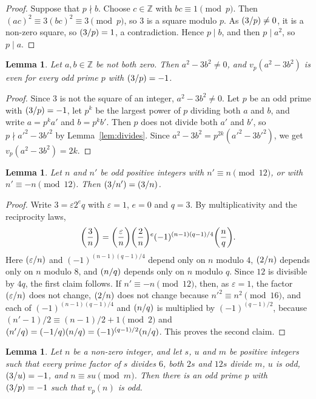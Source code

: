 \documentclass[11pt]{article}
\newtheorem{lemma}[theorem]{Lemma}
\newcommand{\Z}{\mathbb{Z}}
\newcommand{\leg}[2]{\mathchoice{\biggl(\dfrac{#1}{#2}\biggr)}{(#1/#2)}{(#1/#2)}{(#1/#2)}}
\begin{document}
\begin{proof}
Suppose that $p\nmid b$. Choose $c\in\Z$ with $bc\equiv1\pmod p$. Then $(ac)^2\equiv3(bc)^2\equiv3\pmod p$, so $3$ is a square modulo $p$. As $\leg{3}{p}\neq0$, it is a non-zero square, so $\leg{3}{p}=1$, a contradiction. Hence $p\mid b$, and then $p\mid a^2$, so $p\mid a$.
\end{proof}

\begin{lemma}\label{lem:even}
Let $a,b\in\Z$ be not both zero. Then $a^2-3b^2\neq0$, and $v_p(a^2-3b^2)$ is even for every odd prime $p$ with $\leg{3}{p}=-1$.
\end{lemma}

\begin{proof}
Since $3$ is not the square of an integer, $a^2-3b^2\neq0$. Let $p$ be an odd prime with $\leg{3}{p}=-1$, let $p^k$ be the largest power of $p$ dividing both $a$ and $b$, and write $a=p^ka'$ and $b=p^kb'$. Then $p$ does not divide both $a'$ and $b'$, so $p\nmid a'^2-3b'^2$ by Lemma~\ref{lem:divides}. Since $a^2-3b^2=p^{2k}(a'^2-3b'^2)$, we get $v_p(a^2-3b^2)=2k$.
\end{proof}

\begin{lemma}\label{lem:period}
Let $n$ and $n'$ be odd positive integers with $n'\equiv n\pmod{12}$, or with $n'\equiv-n\pmod{12}$. Then $\leg{3}{n'}=\leg{3}{n}$.
\end{lemma}

\begin{proof}
Write $3=\varepsilon2^eq$ with $\varepsilon=1$, $e=0$ and $q=3$. By multiplicativity and the reciprocity laws,
\[
\leg{3}{n}=\leg{\varepsilon}{n}\leg{2}{n}^e(-1)^{(n-1)(q-1)/4}\leg{n}{q}.
\]
Here $\leg{\varepsilon}{n}$ and $(-1)^{(n-1)(q-1)/4}$ depend only on $n$ modulo $4$, $\leg{2}{n}$ depends only on $n$ modulo $8$, and $\leg{n}{q}$ depends only on $n$ modulo $q$. Since $12$ is divisible by $4q$, the first claim follows. If $n'\equiv-n\pmod{12}$, then, as $\varepsilon=1$, the factor $\leg{\varepsilon}{n}$ does not change, $\leg{2}{n}$ does not change because $n'^2\equiv n^2\pmod{16}$, and each of $(-1)^{(n-1)(q-1)/4}$ and $\leg{n}{q}$ is multiplied by $(-1)^{(q-1)/2}$, because $(n'-1)/2\equiv(n-1)/2+1\pmod 2$ and $\leg{n'}{q}=\leg{-1}{q}\leg{n}{q}=(-1)^{(q-1)/2}\leg{n}{q}$. This proves the second claim.
\end{proof}

\begin{lemma}\label{lem:odd}
Let $n$ be a non-zero integer, and let $s$, $u$ and $m$ be positive integers such that every prime factor of $s$ divides $6$, both $2s$ and $12s$ divide $m$, $u$ is odd, $\leg{3}{u}=-1$, and $n\equiv su\pmod m$. Then there is an odd prime $p$ with $\leg{3}{p}=-1$ such that $v_p(n)$ is odd.
\end{lemma}
\end{document}
